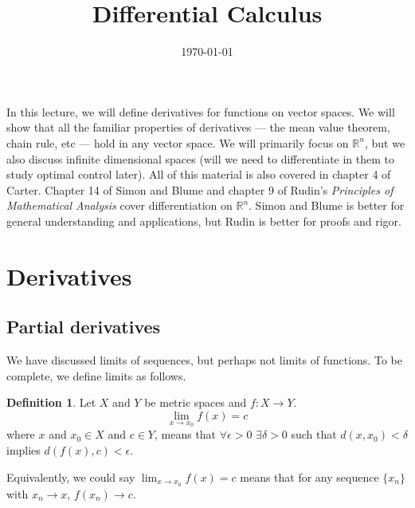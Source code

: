 \documentclass[12pt,reqno]{amsart}
\title{Differential Calculus}
\date{\today}
\theoremstyle{definition}
\newtheorem{definition}{Definition}[section]
\def\R{\mathbb{R}}
\renewcommand{\to}{{\rightarrow}}
\begin{document}
\maketitle



In this lecture, we will define derivatives for functions on vector
spaces. We will show that all the familiar properties of derivatives
--- the mean value theorem, chain rule, etc --- hold in any vector
space. We will primarily focus on $\R^n$, but we also discuss infinite
dimensional spaces (will we need to differentiate in them to study
optimal control later). All of this material is also covered in
chapter 4 of Carter. Chapter 14 of Simon and Blume and chapter 9 of
Rudin's \textsl{Principles of Mathematical Analysis} cover
differentiation on $\R^n$. Simon and Blume is better for general
understanding and applications, but Rudin is better for proofs and
rigor. 

\section{Derivatives}

\subsection{Partial derivatives}
We have discussed limits of sequences, but perhaps not limits of
functions. To be complete, we define limits as follows.
\begin{definition}
  Let $X$ and $Y$ be metric spaces and $f:X \to Y$.
  \[ \lim_{x \to x_0} f(x) = c \]
  where $x$ and $x_0 \in X$ and $c \in Y$, 
  means that $\forall \epsilon > 0$ $\exists \delta > 0$ such that
  $d(x,x_0) < \delta $ implies $d(f(x),c) < \epsilon$. 
\end{definition}
Equivalently, we could say $ \lim_{x \to x_0} f(x) = c $ means that
for any sequence $\{x_n\}$ with $x_n \to x$, $f(x_n) \to c$. 
\end{document}
